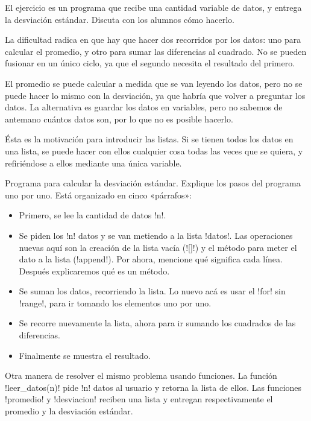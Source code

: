 \documentclass[10pt]{article}
\begin{document}
  El ejercicio es un programa que recibe una cantidad variable de datos,
  y entrega la desviación estándar.
  Discuta con los alumnos cómo hacerlo.

  La dificultad radica en que hay que hacer dos recorridos por los datos:
  uno para calcular el promedio, y otro para sumar las diferencias al cuadrado.
  No se pueden fusionar en un único ciclo,
  ya que el segundo necesita el resultado del primero.

  El promedio se puede calcular a medida que se van leyendo los datos,
  pero no se puede hacer lo mismo con la desviación,
  ya que habría que volver a preguntar los datos.
  La alternativa es guardar los datos en variables,
  pero no sabemos de antemano cuántos datos son,
  por lo que no es posible hacerlo.

  Ésta es la motivación para introducir las listas.
  Si se tienen todos los datos en una lista,
  se puede hacer con ellos cualquier cosa
  todas las veces que se quiera,
  y refiriéndose a ellos mediante una única variable.


  Programa para calcular la desviación estándar.
  Explique los pasos del programa uno por uno.
  Está organizado en cinco «párrafos»:
  \begin{itemize}
    \item Primero, se lee la cantidad de datos \li!n!.
    \item Se piden los \li!n! datos y se van metiendo a la lista \li!datos!.
      Las operaciones nuevas aquí son la creación de la lista vacía (\li![]!)
      y el método para meter el dato a la lista (\li!append!).
      Por ahora, mencione qué significa cada línea.
      Después explicaremos qué es un método.
    \item Se suman los datos, recorriendo la lista.
      Lo nuevo acá es usar el \li!for! sin \li!range!,
      para ir tomando los elementos uno por uno.
    \item Se recorre nuevamente la lista,
      ahora para ir sumando los cuadrados de las diferencias.
    \item Finalmente se muestra el resultado.
  \end{itemize}


  Otra manera de resolver el mismo problema usando funciones.
  La función \li!leer_datos(n)! pide \li!n! datos al usuario y retorna la lista de ellos.
  Las funciones \li!promedio! y \li!desviacion! reciben una lista
  y entregan respectivamente el promedio y la desviación estándar.
\end{document}
